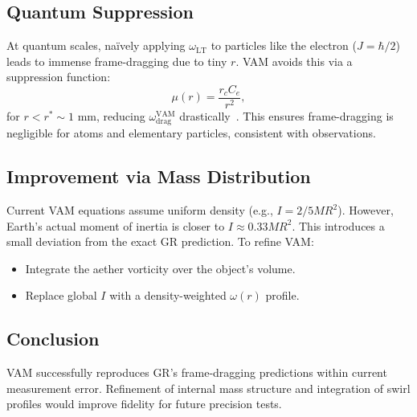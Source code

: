 \subsection*{Quantum Suppression}
At quantum scales, naïvely applying $\omega_{\text{LT}}$ to particles like the electron ($J = \hbar/2$) leads to immense frame-dragging due to tiny $r$. VAM avoids this via a suppression function:
\[
    \mu(r) = \frac{r_c C_e}{r^2},
\]
for $r < r^* \sim 1$ mm, reducing $\omega^{\text{VAM}}_{\text{drag}}$ drastically~\cite{grin3d2025}. This ensures frame-dragging is negligible for atoms and elementary particles, consistent with observations.

\subsection*{Improvement via Mass Distribution}
Current VAM equations assume uniform density (e.g., $I = 2/5MR^2$). However, Earth’s actual moment of inertia is closer to $I \approx 0.33MR^2$. This introduces a small deviation from the exact GR prediction. To refine VAM:
\begin{itemize}
    \item Integrate the aether vorticity over the object’s volume.
    \item Replace global $I$ with a density-weighted $\omega(r)$ profile.
\end{itemize}

\subsection*{Conclusion}
VAM successfully reproduces GR’s frame-dragging predictions within current measurement error. Refinement of internal mass structure and integration of swirl profiles would improve fidelity for future precision tests.

